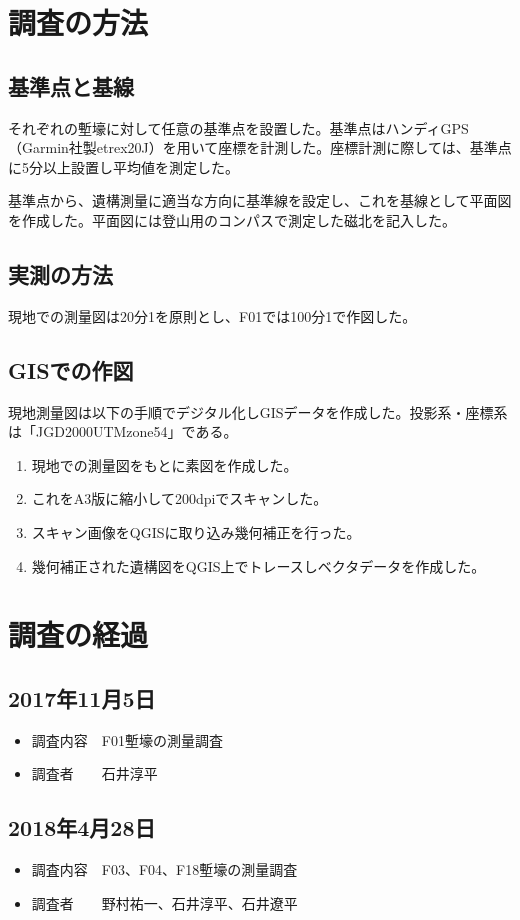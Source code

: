 \documentclass[14Q]{jsarticle}
\begin{document}
\section{調査の方法}
\subsection{基準点と基線}
それぞれの塹壕に対して任意の基準点を設置した。基準点はハンディGPS（Garmin社製etrex20J）を用いて座標を計測した。座標計測に際しては、基準点に5分以上設置し平均値を測定した。

基準点から、遺構測量に適当な方向に基準線を設定し、これを基線として平面図を作成した。平面図には登山用のコンパスで測定した磁北を記入した。

\subsection{実測の方法}
現地での測量図は20分1を原則とし、F01では100分1で作図した。

\subsection{GISでの作図}
現地測量図は以下の手順でデジタル化しGISデータを作成した。投影系・座標系は「JGD2000UTMzone54」である。
\begin{enumerate}
\item 現地での測量図をもとに素図を作成した。
\item これをA3版に縮小して200dpiでスキャンした。
\item スキャン画像をQGISに取り込み幾何補正を行った。
\item 幾何補正された遺構図をQGIS上でトレースしベクタデータを作成した。
\end{enumerate}


\section{調査の経過}
\subsection{2017年11月5日}
\begin{itemize}
\item 調査内容　F01塹壕の測量調査
\item 調査者　　石井淳平
\end{itemize}

\subsection{2018年4月28日}
\begin{itemize}
\item 調査内容　F03、F04、F18塹壕の測量調査
\item 調査者　　野村祐一、石井淳平、石井遼平
\end{itemize}
\end{document}
